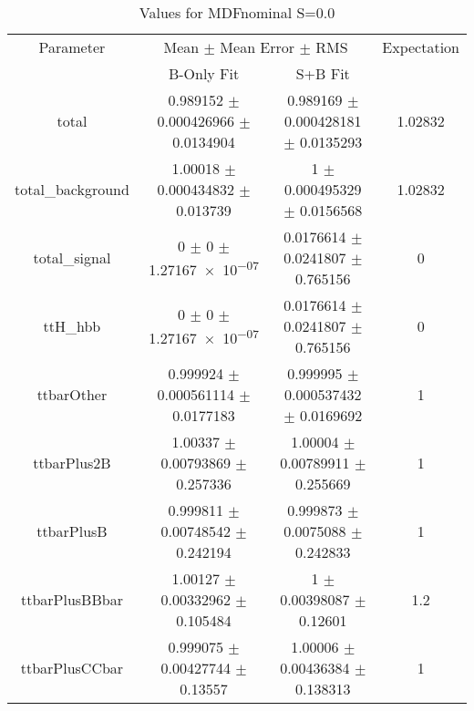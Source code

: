\begin{table}
\centering
\caption{Values for MDFnominal S=0.0}
\begin{tabular}{cccc}
\toprule
Parameter & \multicolumn{2}{c}{Mean $\pm$ Mean Error $\pm$ RMS} & Expectation\\
 & B-Only Fit & S+B Fit & \\
\midrule
total & \num{0.989152} $\pm$ \num{0.000426966} $\pm$ \num{0.0134904} & \num{0.989169} $\pm$ \num{0.000428181} $\pm$ \num{0.0135293} & \num{1.02832}\\
total\_background & \num{1.00018} $\pm$ \num{0.000434832} $\pm$ \num{0.013739} & \num{1} $\pm$ \num{0.000495329} $\pm$ \num{0.0156568} & \num{1.02832}\\
total\_signal & \num{0} $\pm$ \num{0} $\pm$ \num{1.27167e-07} & \num{0.0176614} $\pm$ \num{0.0241807} $\pm$ \num{0.765156} & \num{0}\\
ttH\_hbb & \num{0} $\pm$ \num{0} $\pm$ \num{1.27167e-07} & \num{0.0176614} $\pm$ \num{0.0241807} $\pm$ \num{0.765156} & \num{0}\\
ttbarOther & \num{0.999924} $\pm$ \num{0.000561114} $\pm$ \num{0.0177183} & \num{0.999995} $\pm$ \num{0.000537432} $\pm$ \num{0.0169692} & \num{1}\\
ttbarPlus2B & \num{1.00337} $\pm$ \num{0.00793869} $\pm$ \num{0.257336} & \num{1.00004} $\pm$ \num{0.00789911} $\pm$ \num{0.255669} & \num{1}\\
ttbarPlusB & \num{0.999811} $\pm$ \num{0.00748542} $\pm$ \num{0.242194} & \num{0.999873} $\pm$ \num{0.0075088} $\pm$ \num{0.242833} & \num{1}\\
ttbarPlusBBbar & \num{1.00127} $\pm$ \num{0.00332962} $\pm$ \num{0.105484} & \num{1} $\pm$ \num{0.00398087} $\pm$ \num{0.12601} & \num{1.2}\\
ttbarPlusCCbar & \num{0.999075} $\pm$ \num{0.00427744} $\pm$ \num{0.13557} & \num{1.00006} $\pm$ \num{0.00436384} $\pm$ \num{0.138313} & \num{1}\\
\bottomrule
\end{tabular}
\end{table}